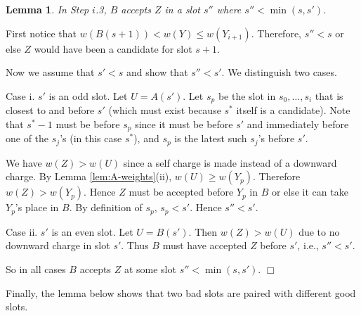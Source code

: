 \documentclass[11pt]{article}
\newtheorem{lemma}{Lemma}[section]
\newcommand{\qed}{\hspace*{\fill}$\Box$\par\medskip}
\newenvironment{proof}{\noindent{\it Proof. }\ignorespaces}{\qed}
\begin{document}
\begin{lemma} \label{lem:case3}
In Step $i$.3, $B$ accepts $Z$ in a slot $s''$ where $s'' < \min(s,s')$.
\end{lemma}
\begin{proof}
First notice that $w(B(s+1)) < w(Y) \leq w(Y_{i+1})$.
Therefore, $s'' < s$
or else $Z$ would have been a candidate for slot $s+1$.

Now we assume that $s' < s$ and show that $s'' < s'$.
We distinguish two cases.

Case i.  $s'$ is an odd slot.  
Let $U = A(s')$.
Let $s_p$ be the slot in $s_0, \ldots, s_i$
that is closest to and before $s'$ 
(which must exist because $s^*$ itself is a candidate).
Note that $s^*-1$ must be before $s_p$ since it must be 
before $s'$ and immediately before one of the $s_j$'s
(in this case $s^*$), and $s_p$ is the latest such
$s_j$'s before $s'$.  

\begin{figure}[h]
\centerline{ \epsfysize=1in  }
\label{fig:s3}
\end{figure}

We have $w(Z) > w(U)$ since a self charge is made instead of a 
downward charge.
By Lemma \ref{lem:A-weights}(ii), $w(U) \ge w(Y_p)$.  
Therefore $w(Z) > w(Y_p)$.
Hence $Z$ must be accepted before $Y_p$ 
in $B$ or else it can take $Y_p$'s place in $B$.
By definition of $s_p$, $s_p < s'$.
Hence $s'' < s'$.

Case ii.  $s'$ is an even slot. 
Let $U = B(s')$.
Then $w(Z) > w(U)$ due to no downward charge in slot $s'$.  
Thus $B$ must have accepted
$Z$ before $s'$, i.e., $s'' < s'$.

So in all cases $B$ accepts $Z$ at some slot $s'' < \min(s, s')$. 
\end{proof}


Finally, the lemma below shows that
two bad slots are paired with different good slots.
\end{document}

